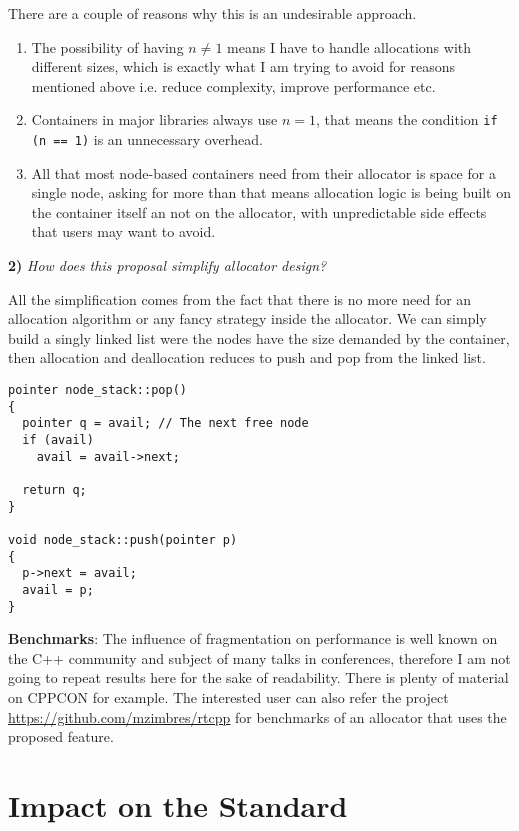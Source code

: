 \documentclass[11pt]{article}
\begin{document}
\noindent
There are a couple of reasons why this is an undesirable approach.

\begin{enumerate}
\item The possibility of having $n \ne 1$ means I have to handle
allocations with different sizes, which is exactly what I am
trying to avoid for reasons mentioned above i.e. reduce
complexity, improve performance etc.

\item Containers in major libraries always use $n = 1$, that
means the condition \texttt{if (n == 1)} is an unnecessary
overhead.

\item All that most node-based containers need from their allocator
is space for a single node, asking for more than that means
allocation logic is being built on the container itself an not on
the allocator, with unpredictable side effects that users may
want to avoid.
\end{enumerate}

\medskip
\noindent
{\bf 2) }{\it How does this proposal simplify allocator design?}

\medskip
\noindent
All the simplification comes from the fact that there is no more
need for an allocation algorithm or any fancy strategy inside the
allocator. We can simply build a singly linked list were the
nodes have the size demanded by the container, then allocation
and deallocation reduces to push and pop from the linked list.

\begin{lstlisting}
pointer node_stack::pop()
{
  pointer q = avail; // The next free node
  if (avail)
    avail = avail->next;

  return q;
}

void node_stack::push(pointer p)
{
  p->next = avail;
  avail = p;
}

\end{lstlisting}

\medskip
\noindent
{\bf Benchmarks}: The influence of fragmentation on performance
is well known on the C++ community and subject of many talks in
conferences, therefore I am not going to repeat results here for
the sake of readability. There is plenty of material on CPPCON
for example.  The interested user can also refer the project
\url{https://github.com/mzimbres/rtcpp}
for benchmarks of an allocator that uses the proposed feature.

\section{Impact on the Standard}
\end{document}
